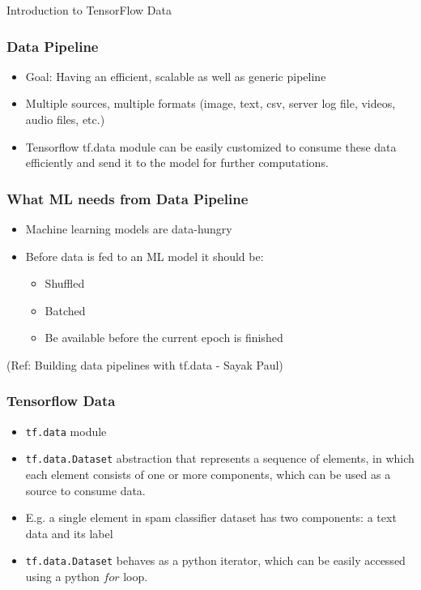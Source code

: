 \begin{frame}
  \begin{center}
    {\Large Introduction to TensorFlow Data}
	
  \end{center}
\end{frame}

\begin{frame}[fragile]\frametitle{Data Pipeline}
\begin{itemize}
\item Goal:  Having an efficient, scalable as well as generic pipeline 
\item Multiple sources, multiple formats (image, text, csv, server log file, videos, audio files, etc.)
\item Tensorflow  tf.data module can be easily customized to consume these data efficiently and send it to the model for further computations. 
\end{itemize}
\end{frame}

\begin{frame}[fragile]\frametitle{What ML needs from Data Pipeline}
\begin{itemize}
\item Machine learning models are data-hungry
\item Before data is fed to an ML model it should be:
\begin{itemize}
\item Shuffled
\item Batched 
\item Be available before the current epoch is finished
\end{itemize}
\end{itemize}

{\tiny (Ref: Building data pipelines with tf.data - Sayak Paul)}
\end{frame}

\begin{frame}[fragile]\frametitle{Tensorflow Data}
\begin{itemize}
\item  \lstinline|tf.data| module
\item \lstinline|tf.data.Dataset| abstraction that represents a sequence of elements, in which each element consists of one or more components, which can be used as a source to consume data.
\item E.g. a single element in spam classifier dataset has two components: a text data and its label 
\item \lstinline|tf.data.Dataset| behaves as a python iterator, which can be easily accessed using a python $for$ loop.
\end{itemize}
\end{frame}

